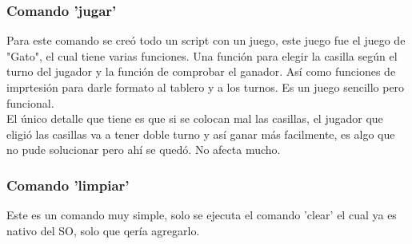 \documentclass[titlepage]{article}
\begin{document}
\subsubsection{Comando 'jugar'}
Para este comando se creó todo un script con un juego, este juego fue el juego de "Gato", el cual tiene varias funciones. Una función para elegir la casilla según el turno del jugador y la función de comprobar el ganador. Así como funciones de imprtesión para darle formato al tablero y a los turnos. Es un juego sencillo pero funcional.\\
El único detalle que tiene es que si se colocan mal las casillas, el jugador que eligió las casillas va a tener doble turno y así ganar más facilmente, es algo que no pude solucionar pero ahí se quedó. No afecta mucho.

\subsubsection{Comando 'limpiar'}
Este es un comando muy simple, solo se ejecuta el comando 'clear' el cual ya es nativo del SO, solo que qería agregarlo.
\end{document}
